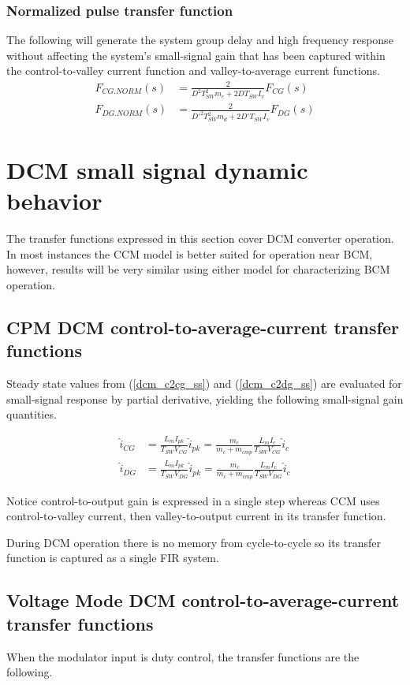 \documentclass{scrartcl}
\begin{document}
		\subsubsection{Normalized pulse transfer function}
		The following will generate the system group delay and high frequency response without affecting the system's small-signal gain that has been captured within the control-to-valley current function and valley-to-average current functions. 
		\begin{align}
		F_{CG.NORM}(s) &= \frac{2}{D^2 T_{SW}^2m_c + 2D T_{SW} I_v} F_{CG}(s)\label{FCG_NORM} \\
		F_{DG.NORM}(s) &= \frac{2}{D'^2 T_{SW}^2m_d + 2D' T_{SW} I_v}F_{DG}(s) \label{FDG_NORM}
		\end{align}
		
\section{DCM small signal dynamic behavior}	
The transfer functions expressed in this section cover DCM converter operation.  In most instances the CCM model is better suited for operation near BCM, however, results will be very similar using either model for characterizing BCM operation.	
	\subsection{CPM DCM control-to-average-current transfer functions }
	Steady state values from (\ref{dcm_c2cg_ss}) and (\ref{dcm_c2dg_ss}) are evaluated for small-signal response by partial derivative, yielding the following small-signal gain quantities.
	
	\begin{align}
	\hat i_{CG} &= \frac{L_mI_{pk}}{T_{SW}V_{CG}}  \hat i_{pk} =  \frac{m_c}{m_c + m_{cmp}}\frac{L_mI_{c}}{T_{SW}V_{CG}} \hat i_{c} \\
	\hat i_{DG} &= \frac{L_mI_{pk}}{T_{SW}V_{DG}} \hat i_{pk} =  \frac{m_c}{m_c + m_{cmp}}\frac{L_mI_{c}}{T_{SW}V_{DG}} \hat i_{c}
	\end{align}
	
	Notice control-to-output gain is expressed in a single step whereas CCM uses control-to-valley current, then valley-to-output current in its transfer function.
	
	During DCM operation there is no memory from cycle-to-cycle so its transfer function is captured as a single FIR system.

	\subsection{Voltage Mode DCM control-to-average-current transfer functions}
	When the modulator input is duty control, the transfer functions are the following.
	
\end{document}

